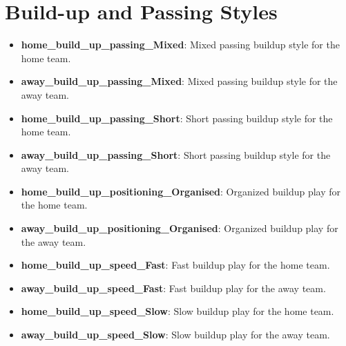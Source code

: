 \section{Build-up and Passing Styles}
\begin{itemize}
    \item \textbf{home\_build\_up\_passing\_Mixed}: Mixed passing buildup style for the home team.
    \item \textbf{away\_build\_up\_passing\_Mixed}: Mixed passing buildup style for the away team.
    \item \textbf{home\_build\_up\_passing\_Short}: Short passing buildup style for the home team.
    \item \textbf{away\_build\_up\_passing\_Short}: Short passing buildup style for the away team.
    \item \textbf{home\_build\_up\_positioning\_Organised}: Organized buildup play for the home team.
    \item \textbf{away\_build\_up\_positioning\_Organised}: Organized buildup play for the away team.
    \item \textbf{home\_build\_up\_speed\_Fast}: Fast buildup play for the home team.
    \item \textbf{away\_build\_up\_speed\_Fast}: Fast buildup play for the away team.
    \item \textbf{home\_build\_up\_speed\_Slow}: Slow buildup play for the home team.
    \item \textbf{away\_build\_up\_speed\_Slow}: Slow buildup play for the away team.
\end{itemize}

